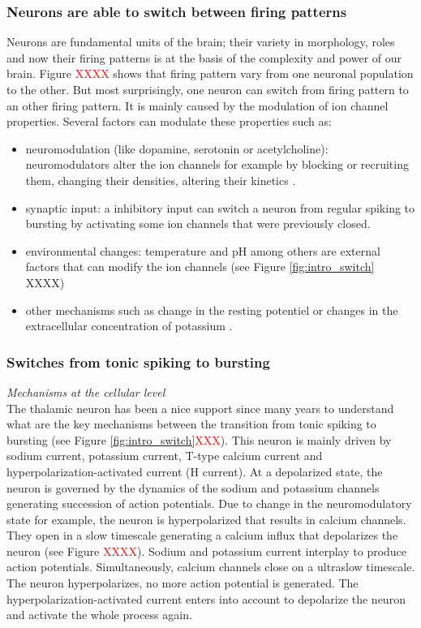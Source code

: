 \subsubsection{Neurons are able to switch between firing patterns}
Neurons are fundamental units of the brain; their variety in morphology, roles and now their firing patterns is at the basis of the complexity and power of our  brain.  Figure \textcolor{red}{XXXX} shows that firing pattern vary from one neuronal population to the other. But most surprisingly, one neuron can switch from firing pattern to an other firing pattern. It is mainly caused by the modulation of ion channel properties. Several factors can modulate these properties such as:
\begin{itemize}
    \item neuromodulation (like dopamine, serotonin or acetylcholine): neuromodulators alter the ion channels for example by blocking or recruiting them, changing their densities, altering their kinetics \citep{steriade_novel_1993}. 
    \item synaptic input: a inhibitory input can switch a neuron from regular spiking to bursting by activating some ion channels that were previously closed. 
    \item environmental changes: temperature and pH among others are external factors that can modify the ion channels \citep{hedrick_effect_2012} (see Figure \ref{fig:intro_switch} XXXX)   
    \item other mechanisms such as change in the resting potentiel or changes in the extracellular concentration of potassium \citep{frohlich_coexistence_2006}.
\end{itemize}


\subsubsection{Switches from tonic spiking to bursting}
\textit{Mechanisms at the cellular level}\\
The thalamic neuron has been a nice support since many years to understand what are the key mechanisms between the transition from tonic spiking to bursting \citep{mccormick_sleep_1997, cain_contributions_2010} (see Figure \ref{fig:intro_switch}\textcolor{red}{XXX}).  This neuron is mainly driven by sodium current, potassium current, T-type calcium current and hyperpolarization-activated current (H current). At a depolarized state, the neuron is governed by the dynamics of the sodium and potassium channels generating succession of action potentials. Due to change in the neuromodulatory state for example, the neuron is hyperpolarized that results in calcium channels. They open in a slow timescale generating a calcium influx that depolarizes the neuron (see Figure \textcolor{red}{XXXX}). Sodium and potassium current interplay to produce action potentials. Simultaneously, calcium channels close on a ultraslow timescale. The neuron hyperpolarizes, no more action potential is generated. The hyperpolarization-activated current enters into account to depolarize the neuron and activate the whole process again. 

